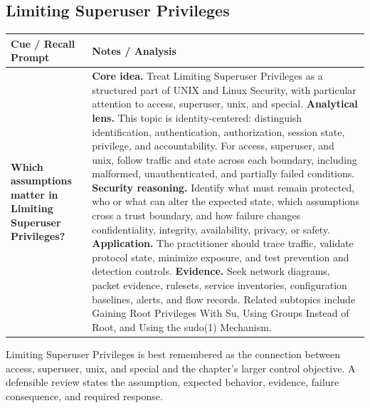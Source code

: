 \documentclass[11pt]{article}
\newcommand{\CornellHeader}{%
\rowcolor{Navy}\color{white}\bfseries Cue / Recall Prompt & \color{white}\bfseries Notes / Analysis\\\hline}
\newcommand{\CornellRow}[2]{%
\cellcolor{CueGray}\RaggedRight\textbf{#1} & \RaggedRight #2\\\hline}
\begin{document}
\subsection*{Limiting Superuser Privileges}
\begin{longtable}{>{\RaggedRight\arraybackslash}p{}|>{\RaggedRight\arraybackslash}p{}}
\CornellHeader
\CornellRow{Which assumptions matter in Limiting Superuser Privileges?}{\textbf{Core idea.} Treat Limiting Superuser Privileges as a structured part of UNIX and Linux Security, with particular attention to access, superuser, unix, and special. \textbf{Analytical lens.} This topic is identity-centered: distinguish identification, authentication, authorization, session state, privilege, and accountability. For access, superuser, and unix, follow traffic and state across each boundary, including malformed, unauthenticated, and partially failed conditions. \textbf{Security reasoning.} Identify what must remain protected, who or what can alter the expected state, which assumptions cross a trust boundary, and how failure changes confidentiality, integrity, availability, privacy, or safety. \textbf{Application.} The practitioner should trace traffic, validate protocol state, minimize exposure, and test prevention and detection controls. \textbf{Evidence.} Seek network diagrams, packet evidence, rulesets, service inventories, configuration baselines, alerts, and flow records. Related subtopics include Gaining Root Privileges With Su, Using Groups Instead of Root, and Using the sudo(1) Mechanism.}
\end{longtable}
\begin{topicsummary}
Limiting Superuser Privileges is best remembered as the connection between access, superuser, unix, and special and the chapter's larger control objective. A defensible review states the assumption, expected behavior, evidence, failure consequence, and required response.
\end{topicsummary}
\end{document}
